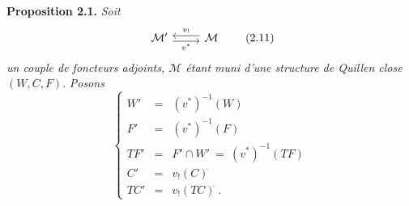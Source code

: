 \documentclass[11pt]{article}
\newcommand{\printedpage}[1]{\marginpar{\footnotesize p.~#1}}
\newcommand{\M}{\mathcal{M}}
\begin{document}
\printedpage{10}

\textbf{Proposition 2.1.} \textit{Soit}
\[
\begin{tikzcd}
\M' \arrow[r, shift right, "v^*"'] & \M \arrow[l, shift right, "v_!"']
\end{tikzcd}
\tag*{(2.11)} %
\]
\textit{un couple de foncteurs adjoints, $\M$ étant muni d'une structure de Quillen close} $(W,C,F)$. \textit{Posons}
\[
\left\{
\begin{array}{rcl}
W' & = & (v^*)^{-1}(W)\\
F' & = & (v^*)^{-1}(F)\\
TF' & = & F' \cap W' \ = \ (v^*)^{-1}(TF)\\
C' & = & v_!(C)^{\breve{}}\\
TC' & = & v_!(TC)^{\breve{}}\ .
\end{array}\right.
\tag*{(2.1.2)}
\]
\end{document}
